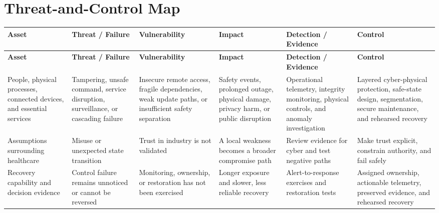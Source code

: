 \documentclass[11pt,letterpaper]{article}
\begin{document}
\section*{Threat-and-Control Map}
\begingroup\scriptsize\setlength{\tabcolsep}{2pt}
\begin{longtable}{>{\raggedright\arraybackslash}p{}>{\raggedright\arraybackslash}p{}>{\raggedright\arraybackslash}p{}>{\raggedright\arraybackslash}p{}>{\raggedright\arraybackslash}p{}>{\raggedright\arraybackslash}p{}}
\toprule\rowcolor{Navy}\color{white}\textbf{Asset} & \color{white}\textbf{Threat / Failure} & \color{white}\textbf{Vulnerability} & \color{white}\textbf{Impact} & \color{white}\textbf{Detection / Evidence} & \color{white}\textbf{Control}\\\midrule
\endfirsthead
\toprule\rowcolor{Navy}\color{white}\textbf{Asset} & \color{white}\textbf{Threat / Failure} & \color{white}\textbf{Vulnerability} & \color{white}\textbf{Impact} & \color{white}\textbf{Detection / Evidence} & \color{white}\textbf{Control}\\\midrule
\endhead
People, physical processes, connected devices, and essential services & Tampering, unsafe command, service disruption, surveillance, or cascading failure & Insecure remote access, fragile dependencies, weak update paths, or insufficient safety separation & Safety events, prolonged outage, physical damage, privacy harm, or public disruption & Operational telemetry, integrity monitoring, physical controls, and anomaly investigation & Layered cyber-physical protection, safe-state design, segmentation, secure maintenance, and rehearsed recovery\\\midrule
Assumptions surrounding healthcare & Misuse or unexpected state transition & Trust in industry is not validated & A local weakness becomes a broader compromise path & Review evidence for cyber and test negative paths & Make trust explicit, constrain authority, and fail safely\\\midrule
Recovery capability and decision evidence & Control failure remains unnoticed or cannot be reversed & Monitoring, ownership, or restoration has not been exercised & Longer exposure and slower, less reliable recovery & Alert-to-response exercises and restoration tests & Assigned ownership, actionable telemetry, preserved evidence, and rehearsed recovery\\\midrule
\bottomrule
\end{longtable}
\endgroup
\end{document}
